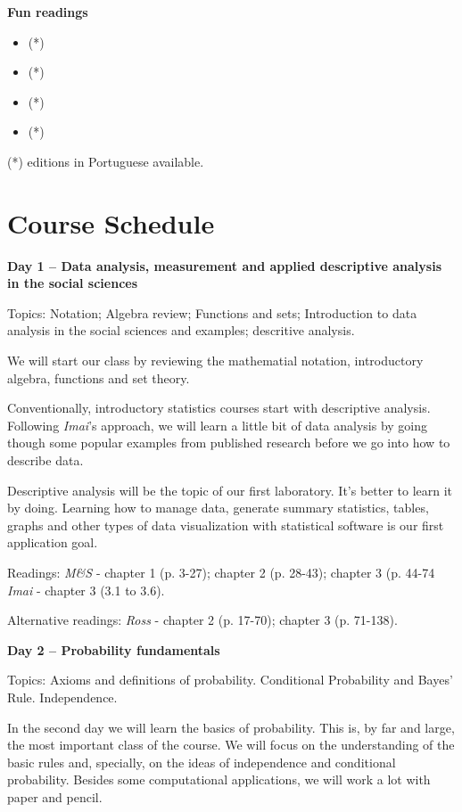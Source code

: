 \documentclass[a4paper,11pt]{article}
\begin{document}
\textbf{Fun readings}

\begin{itemize}
  \item {} (*)
  \item {} (*)
  \item {} (*)
  \item {} (*)
\end{itemize}


(*) editions in Portuguese available.

\pagebreak
\section{Course Schedule}

\textbf{Day 1 -- Data analysis, measurement and applied descriptive analysis in the social sciences}

Topics: Notation; Algebra review; Functions and sets; Introduction to data analysis in the social sciences and examples; descritive analysis.

We will start our class by reviewing the mathematial notation, introductory algebra, functions and set theory.

Conventionally, introductory statistics courses start with descriptive analysis. Following \emph{Imai}'s approach, we will learn a little bit of data analysis by going though some popular examples from published research before we go into how to describe data. 

Descriptive analysis will be the topic of our first laboratory. It's better to learn it by doing. Learning how to manage data, generate summary statistics, tables, graphs and other types of data visualization with statistical software is our first application goal.

Readings: \emph{M\&S} - chapter 1 (p. 3-27); chapter 2 (p. 28-43); chapter 3 (p. 44-74 \emph{Imai} - chapter 3 (3.1 to 3.6).

Alternative readings: \emph{Ross} - chapter 2 (p. 17-70); chapter 3 (p. 71-138).

\textbf{Day 2 -- Probability fundamentals}

Topics: Axioms and definitions of probability. Conditional Probability and Bayes' Rule. Independence.

In the second day we will learn the basics of probability. This is, by far and large, the most important class of the course. We will focus on the understanding of the basic rules and, specially, on the ideas of independence and conditional probability. Besides some computational applications, we will work a lot with paper and pencil.
\end{document}
